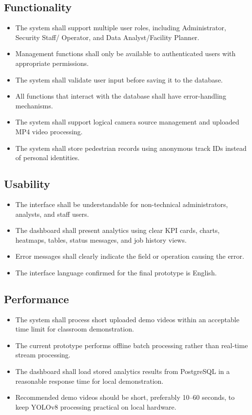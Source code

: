 \documentclass[12pt,a4paper]{report}
\begin{document}
\subsection*{Functionality}
\begin{itemize}
    \item The system shall support multiple user roles, including Administrator, Security Staff/ Operator, and Data Analyst/Facility Planner.
    \item Management functions shall only be available to authenticated users with appropriate permissions.
    \item The system shall validate user input before saving it to the database.
    \item All functions that interact with the database shall have error-handling mechanisms.
    \item The system shall support logical camera source management and uploaded MP4 video processing.
    \item The system shall store pedestrian records using anonymous track IDs instead of personal identities.
\end{itemize}

\subsection*{Usability}
\begin{itemize}
    \item The interface shall be understandable for non-technical administrators, analysts, and staff users.
    \item The dashboard shall present analytics using clear KPI cards, charts, heatmaps, tables, status messages, and job history views.
    \item Error messages shall clearly indicate the field or operation causing the error.
    \item The interface language confirmed for the final prototype is English.
\end{itemize}

\subsection*{Performance}
\begin{itemize}
    \item The system shall process short uploaded demo videos within an acceptable time limit for classroom demonstration.
    \item The current prototype performs offline batch processing rather than real-time stream processing.
    \item The dashboard shall load stored analytics results from PostgreSQL in a reasonable response time for local demonstration.
    \item Recommended demo videos should be short, preferably 10--60 seconds, to keep YOLOv8 processing practical on local hardware.
\end{itemize}
\end{document}
